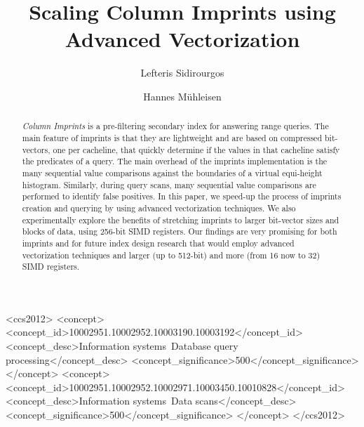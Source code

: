 \documentclass[sigconf]{acmart}
\begin{document}
\title{Scaling Column Imprints using Advanced Vectorization}

\author{Lefteris Sidirourgos}

\author{Hannes M\"uhleisen}


\lstset{basicstyle=\ttfamily}


\begin{abstract}
{\em Column Imprints} is a pre-filtering secondary index for answering range queries. The main feature of imprints is that they are
lightweight and are based on compressed bit-vectors, one per cacheline, that quickly determine if the values in that cacheline 
satisfy the predicates of a query. The main overhead of the imprints implementation is the many sequential value comparisons against 
the boundaries of a virtual equi-height histogram. Similarly, during query scans, many sequential value comparisons are performed to
identify false positives. In this paper, we speed-up the process of imprints creation and querying by using advanced vectorization 
techniques. We also experimentally explore the benefits of stretching imprints to larger bit-vector sizes and blocks of data, using
256-bit SIMD registers. Our findings are very promising for both imprints and for future index design research that would employ 
advanced vectorization techniques and larger (up to 512-bit) and more (from 16 now to 32) SIMD registers.

\end{abstract}

\begin{CCSXML}
<ccs2012>
<concept>
<concept_id>10002951.10002952.10003190.10003192</concept_id>
<concept_desc>Information systems~Database query processing</concept_desc>
<concept_significance>500</concept_significance>
</concept>
<concept>
<concept_id>10002951.10002952.10002971.10003450.10010828</concept_id>
<concept_desc>Information systems~Data scans</concept_desc>
<concept_significance>500</concept_significance>
</concept>
</ccs2012>
\end{CCSXML}
\end{document}
